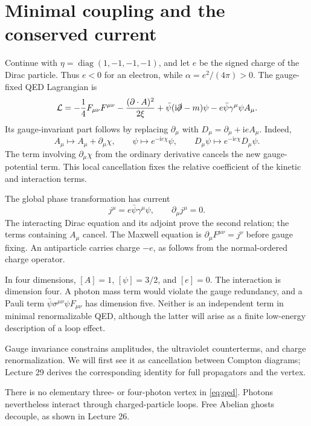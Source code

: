 \documentclass[11pt]{article}
\newcommand{\ii}{\mathrm i}
\newcommand{\diag}{\operatorname{diag}}
\newcommand{\Lag}{\mathcal L}
\begin{document}
\section{Minimal coupling and the conserved current}
Continue with \(\eta=\diag(1,-1,-1,-1)\), and let \(e\) be the signed
charge of the Dirac particle. Thus \(e<0\) for an electron, while
\(\alpha=e^2/(4\pi)>0\). The gauge-fixed QED Lagrangian is
\begin{equation}
 \Lag=-\frac14F_{\mu\nu}F^{\mu\nu}
 -\frac{(\partial\cdot A)^2}{2\xi}
 +\bar\psi(\ii\slashed\partial-m)\psi
 -e\bar\psi\gamma^\mu\psi A_\mu.
 \label{eq:qed}
\end{equation}
Its gauge-invariant part follows by replacing \(\partial_\mu\) with
\(D_\mu=\partial_\mu+\ii e A_\mu\). Indeed,
\begin{equation}
 A_\mu\longmapsto A_\mu+\partial_\mu\chi,\qquad
 \psi\longmapsto e^{-\ii e\chi}\psi,
 \qquad D_\mu\psi\longmapsto e^{-\ii e\chi}D_\mu\psi.
\end{equation}
The term involving \(\partial_\mu\chi\) from the ordinary derivative
cancels the new gauge-potential term. This local cancellation fixes the
relative coefficient of the kinetic and interaction terms.

The global phase transformation has current
\begin{equation}
 j^\mu=e\bar\psi\gamma^\mu\psi,\qquad \partial_\mu j^\mu=0.
\end{equation}
The interacting Dirac equation and its adjoint prove the second relation;
the terms containing \(A_\mu\) cancel. The Maxwell equation is
\(\partial_\mu F^{\mu\nu}=j^\nu\) before gauge fixing. An antiparticle
carries charge \(-e\), as follows from the normal-ordered charge operator.

In four dimensions, \([A]=1\), \([\psi]=3/2\), and \([e]=0\).
The interaction is dimension four. A photon mass term would violate the
gauge redundancy, and a Pauli term \(\bar\psi\sigma^{\mu\nu}\psi F_{\mu\nu}\)
has dimension five. Neither is an independent term in minimal
renormalizable QED, although the latter will arise as a finite
low-energy description of a loop effect.

\begin{keyidea}
Gauge invariance constrains amplitudes, the ultraviolet counterterms,
and charge renormalization. We will first see it as cancellation between
Compton diagrams; Lecture 29 derives the corresponding identity for
full propagators and the vertex.
\end{keyidea}
There is no elementary three- or four-photon vertex in \eqref{eq:qed}.
Photons nevertheless interact through charged-particle loops. Free
Abelian ghosts decouple, as shown in Lecture 26.
\end{document}
